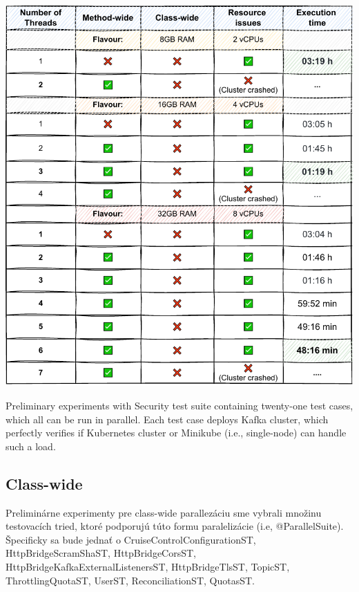 \begin{table}[ht!]
    \centering
    \includegraphics[scale=0.8]{obrazky-figures/08-experiments/06-exp-preliminary-minikube-b}
    \caption{Preliminary experiments with Security test suite containing twenty-one test cases, which all can be run in parallel.
    Each test case deploys Kafka cluster, which perfectly verifies if Kubernetes cluster or Minikube (i.e., single-node) can handle such a load.}
    \label{06:tab:01:securityst-minikube}
\end{table}

\subsection{Class-wide}

Preliminárne experimenty pre class-wide parallezáciu sme vybrali množinu testovacích tried, ktoré podporujú túto formu
paralelizácie (i.e, @ParallelSuite).
Špecificky sa bude jednať o CruiseControlConfigurationST, HttpBridgeScramShaST, HttpBridgeCorsST, HttpBridgeKafkaExternalListenersST,
HttpBridgeTlsST, TopicST, ThrottlingQuotaST, UserST, ReconciliationST, QuotasST.

